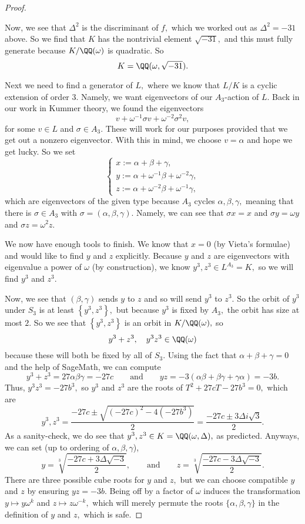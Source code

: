 \documentclass[../notes.tex]{subfiles}
\begin{document}
\begin{proof}
\begin{listroman}
		Now, we see that $\Delta^2$ is the discriminant of $f,$ which we worked out as $\Delta^2=-31$ above. So we find that $K$ has the nontrivial element $\sqrt{-31},$ and this must fully generate because $K/\QQ(\omega)$ is quadratic. So
		\[K=\QQ(\omega,\sqrt{-31}).\]

		\item Next we need to find a generator of $L,$ where we know that $L/K$ is a cyclic extension of order $3.$ Namely, we want eigenvectors of our $A_3$-action of $L.$ Back in our work in Kummer theory, we found the eigenvectors
		\[v+\omega^{-1}\sigma v+\omega^{-2}\sigma^2v,\]
		for some $v\in L$ and $\sigma\in A_3.$ These will work for our purposes provided that we get out a nonzero eigenvector. With this in mind, we choose $v=\alpha$ and hope we get lucky. So we set
		\[\begin{cases}
			x := \alpha+\beta+\gamma, \\
			y := \alpha+\omega^{-1}\beta+\omega^{-2}\gamma, \\
			z := \alpha+\omega^{-2}\beta+\omega^{-1}\gamma,
		\end{cases}\]
		which are eigenvectors of the given type because $A_3$ cycles $\alpha,\beta,\gamma,$ meaning that there is $\sigma\in A_3$ with $\sigma=(\alpha,\beta,\gamma).$ Namely, we can see that $\sigma x=x$ and $\sigma y=\omega y$ and $\sigma z=\omega^2z.$
	\end{listroman}
	We now have enough tools to finish. We know that $x=0$ (by Vieta's formulae) and would like to find $y$ and $z$ explicitly. Because $y$ and $z$ are eigenvectors with eigenvalue a power of $\omega$ (by construction), we know $y^3,z^3\in L^{A_3}=K,$ so we will find $y^3$ and $z^3.$
	
	Now, we see that $(\beta,\gamma)$ sends $y$ to $z$ and so will send $y^3$ to $z^3.$ So the orbit of $y^3$ under $S_3$ is at least $\left\{y^3,z^3\right\},$ but because $y^3$ is fixed by $A_3,$ the orbit has size at most $2.$ So we see that $\left\{y^3,z^3\right\}$ is an orbit in $K/\QQ(\omega),$ so
	\[y^3+z^3,\quad y^3z^3\in\QQ(\omega)\]
	because these will both be fixed by all of $S_3.$ Using the fact that $\alpha+\beta+\gamma=0$ and the help of SageMath, we can compute
	\[y^3+z^3=27\alpha\beta\gamma=-27c\qquad\text{and}\qquad yz=-3(\alpha\beta+\beta\gamma+\gamma\alpha)=-3b.\]
	Thus, $y^3z^3=-27b^3,$ so $y^3$ and $z^3$ are the roots of $T^2+27cT-27b^3=0,$ which are
	\[y^3,z^3=\frac{-27c\pm\sqrt{(-27c)^2-4\left(-27b^3\right)}}2=\frac{-27c\pm3\Delta i\sqrt3}2.\]
	As a sanity-check, we do see that $y^3,z^3\in K=\QQ(\omega,\Delta),$ as predicted. Anyways, we can set (up to ordering of $\alpha,\beta,\gamma$),
	\[y=\sqrt[3]{\frac{-27c+3\Delta\sqrt{-3}}2},\qquad\text{and}\qquad z=\sqrt[3]{\frac{-27c-3\Delta\sqrt{-3}}2}.\]
	There are three possible cube roots for $y$ and $z,$ but we can choose compatible $y$ and $z$ by ensuring $yz=-3b.$ Being off by a factor of $\omega$ induces the transformation $y\mapsto y\omega^k$ and $z\mapsto z\omega^{-k},$ which will merely permute the roots $\{\alpha,\beta,\gamma\}$ in the definition of $y$ and $z,$ which is safe.


\end{proof}
\end{document}
